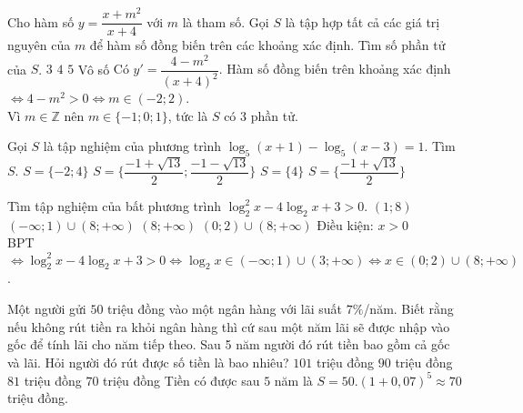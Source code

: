 \begin{ex}%
	Cho hàm số $y=\dfrac{x+m^2}{x+4}$ với $m$ là tham số. Gọi $S$ là tập hợp tất cả các giá trị nguyên của $m$ để hàm số đồng biến trên các khoảng xác định. Tìm số phần tử của $S$.	
	\choice
	{\True $ 3$}
	{$ 4$}
	{$5 $}
	{Vô số}
	\loigiai
	{Có $y'=\dfrac{4-m^2}{(x+4)^2}$. Hàm số đồng biến trên khoảng xác định $\Leftrightarrow 4-m^2>0\Leftrightarrow m\in (-2;2)$. \\
		Vì $m\in \mathbb{Z}$ nên $m\in\{-1;0;1\}$, tức là $S$ có 3 phần tử.}
\end{ex}
\begin{ex}%
	Gọi $S$ là tập nghiệm của phương trình $\log_5(x+1)-\log_5(x-3)=1$. Tìm $S$.
	\choice
	{$S=\{-2;4\} $}
	{$S=\{\dfrac{-1+\sqrt{13}}{2};\dfrac{-1-\sqrt{13}}{2}\} $}
	{\True $S=\{4\} $}
	{$S=\{\dfrac{-1+\sqrt{13}}{2}\} $}
\end{ex}
\begin{ex}%
	Tìm tập nghiệm của bất phương trình $\log_2^2x-4\log_2x+3>0$.
	\choice
	{$(1;8) $}
	{$(-\infty;1)\cup(8;+\infty) $}
	{$(8;+\infty) $}
	{\True $(0;2)\cup(8;+\infty) $}
	\loigiai
	{Điều kiện: $x>0$\\
		BPT $\Leftrightarrow \log_2^2x-4\log_2x+3>0\Leftrightarrow\log_2x\in(-\infty;1)\cup(3;+\infty)\Leftrightarrow x\in (0;2)\cup(8;+\infty)$.
	}
\end{ex}
\begin{ex}%
	Một người gửi $50$ triệu đồng vào một ngân hàng với lãi suất $7\%$/năm. Biết rằng nếu không rút tiền ra khỏi ngân hàng thì cứ sau một năm lãi sẽ được nhập vào gốc để tính lãi cho năm tiếp theo. Sau 5 năm người đó rút tiền bao gồm cả gốc và lãi. Hỏi người đó rút được số tiền là bao nhiêu?
	\choice
	{$101 $ triệu đồng}
	{$90 $ triệu đồng}
	{$ 81$ triệu đồng}
	{\True $70 $ triệu đồng}
	\loigiai
	{Tiền có được sau $5$ năm là $S=50.(1+0,07)^5\approx 70$ triệu đồng.}
\end{ex}
